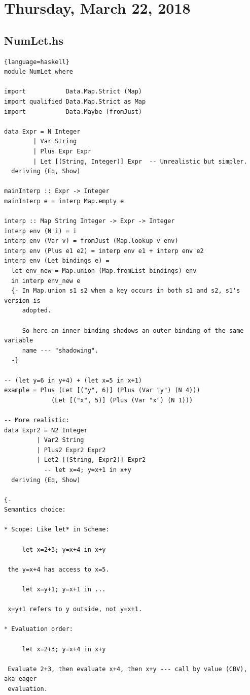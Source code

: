\documentclass[12pt]{article}
\begin{document}
\section{Thursday, March 22, 2018}

\subsection{NumLet.hs}

\begin{lstlisting}{language=haskell}
module NumLet where

import           Data.Map.Strict (Map)
import qualified Data.Map.Strict as Map
import           Data.Maybe (fromJust)

data Expr = N Integer
        | Var String
        | Plus Expr Expr
        | Let [(String, Integer)] Expr  -- Unrealistic but simpler.
  deriving (Eq, Show)

mainInterp :: Expr -> Integer
mainInterp e = interp Map.empty e

interp :: Map String Integer -> Expr -> Integer
interp env (N i) = i
interp env (Var v) = fromJust (Map.lookup v env)
interp env (Plus e1 e2) = interp env e1 + interp env e2
interp env (Let bindings e) =
  let env_new = Map.union (Map.fromList bindings) env
  in interp env_new e
  {- In Map.union s1 s2 when a key occurs in both s1 and s2, s1's version is
     adopted.

     So here an inner binding shadows an outer binding of the same variable
     name --- "shadowing".
  -}

-- (let y=6 in y+4) + (let x=5 in x+1)
example = Plus (Let [("y", 6)] (Plus (Var "y") (N 4)))
             (Let [("x", 5)] (Plus (Var "x") (N 1)))

-- More realistic:
data Expr2 = N2 Integer
         | Var2 String
         | Plus2 Expr2 Expr2
         | Let2 [(String, Expr2)] Expr2
           -- let x=4; y=x+1 in x+y
  deriving (Eq, Show)

{-
Semantics choice:

* Scope: Like let* in Scheme:

     let x=2+3; y=x+4 in x+y

 the y=x+4 has access to x=5.

     let x=y+1; y=x+1 in ...

 x=y+1 refers to y outside, not y=x+1.

* Evaluation order:

     let x=2+3; y=x+4 in x+y

 Evaluate 2+3, then evaluate x+4, then x+y --- call by value (CBV), aka eager
 evaluation.


\end{lstlisting}
\end{document}
